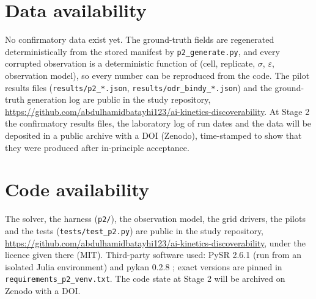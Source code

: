 \documentclass[11pt]{article}
\begin{document}
\section*{Data availability}
No confirmatory data exist yet. The ground-truth fields are regenerated deterministically
from the stored manifest by \texttt{p2\_generate.py}, and every corrupted observation is a
deterministic function of (cell, replicate, $\sigma$, $\varepsilon$, observation model),
so every number can be reproduced from the code. The pilot results files
(\texttt{results/p2\_*.json}, \texttt{results/odr\_bindy\_*.json}) and the ground-truth
generation log are public in the study repository,
\url{https://github.com/abdulhamidbatayhi123/ai-kinetics-discoverability}. At Stage 2 the
confirmatory results files, the laboratory log of run dates and the data will be deposited
in a public archive with a DOI (Zenodo), time-stamped to show that they were produced
after in-principle acceptance.

\section*{Code availability}
\begin{sloppypar}
The solver, the harness (\texttt{p2/}), the observation model, the grid drivers, the
pilots and the tests (\texttt{tests/test\_p2.py}) are public in the study repository,
\url{https://github.com/abdulhamidbatayhi123/ai-kinetics-discoverability}, under the licence
given there (MIT). Third-party software used: PySR 2.6.1 \citep{cranmer2023} (run from an
isolated Julia environment) and pykan 0.2.8 \citep{liu2024}; exact versions are pinned in
\texttt{requirements\_p2\_venv.txt}. The code state at Stage 2 will be archived on Zenodo
with a DOI.
\end{sloppypar}
\end{document}
